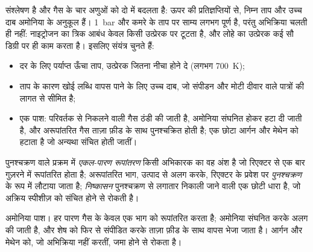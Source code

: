 संश्लेषण  है और गैस के चार अणुओं को दो में बदलता है: ऊपर की
प्रतिज्ञप्तियों से, निम्न ताप और उच्च दाब अमोनिया के अनुकूल हैं।
\qty{1}{bar} और कमरे के ताप पर साम्य लगभग पूर्ण है, परंतु
अभिक्रिया चलती ही नहीं: नाइट्रोजन का त्रिक आबंध केवल किसी
उत्प्रेरक पर टूटता है, और लोहे का उत्प्रेरक कई सौ डिग्री पर ही
काम करता है। इसलिए संयंत्र चुनते हैं:
\begin{itemize}
  \item दर के लिए पर्याप्त ऊँचा ताप, उत्प्रेरक जितना नीचा होने दे
        (लगभग \qty{700}{K});
  \item ताप के कारण खोई लब्धि वापस पाने के लिए उच्च दाब, जो
        संपीडन और मोटी दीवार वाले पात्रों की लागत से सीमित है;
  \item एक पाश: परिवर्तक से निकलने वाली गैस ठंडी की जाती है, अमोनिया संघनित होकर
        हटा दी जाती है, और अरूपांतरित गैस ताज़ा फ़ीड के साथ पुनश्चक्रित होती है;
        एक छोटा  आर्गन और मेथेन को हटाता है जो अन्यथा
        संचित होती जातीं।
\end{itemize}

\begin{definition}\label{def:b2:equilibrium-shifts:single-pass}
पुनश्चक्रण वाले प्रक्रम में \emph{एकल-पारण रूपांतरण}
किसी अभिकारक का वह अंश है जो रिएक्टर से एक बार गुज़रने में रूपांतरित
होता है; अरूपांतरित भाग, उत्पाद से अलग करके, रिएक्टर के प्रवेश पर
\emph{पुनश्चक्रण} के रूप में लौटाया जाता है;
\emph{निष्कासन} पुनश्चक्रण से लगातार निकाली जाने वाली एक छोटी धारा है,
जो अक्रिय स्पीशीज़ को संचित होने से रोकती है।
\end{definition}

\begin{omfigure}

{\small अमोनिया पाश। हर पारण गैस के केवल एक भाग को रूपांतरित करता है; अमोनिया
संघनित करके अलग की जाती है, और शेष को फिर से संपीडित करके ताज़ा
फ़ीड के साथ वापस भेजा जाता है।  आर्गन और मेथेन को, जो अभिक्रिया नहीं
करतीं, जमा होने से रोकता है।}
\end{omfigure}

